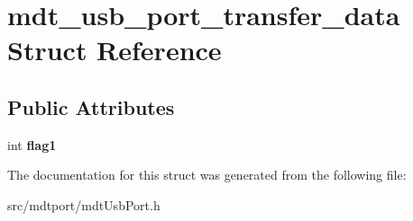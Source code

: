 \hypertarget{structmdt__usb__port__transfer__data}{
\section{mdt\_\-usb\_\-port\_\-transfer\_\-data Struct Reference}
\label{structmdt__usb__port__transfer__data}
}
\subsection*{Public Attributes}
\begin{DoxyCompactItemize}
\item 
\hypertarget{structmdt__usb__port__transfer__data_a01c4199d4a4e66294b594a42fa14f438}{
int {\bfseries flag1}}
\label{structmdt__usb__port__transfer__data_a01c4199d4a4e66294b594a42fa14f438}

\end{DoxyCompactItemize}


The documentation for this struct was generated from the following file:\begin{DoxyCompactItemize}
\item 
src/mdtport/mdtUsbPort.h\end{DoxyCompactItemize}
